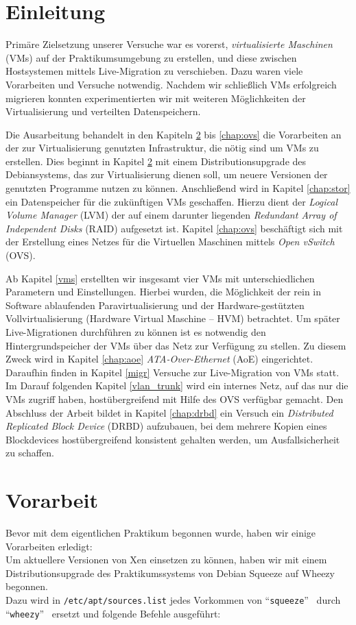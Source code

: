 \chapter{Einleitung}

Primäre Zielsetzung unserer Versuche war es vorerst, \emph{virtualisierte
Maschinen} (VMs) auf der Praktikumsumgebung zu erstellen, und diese
zwischen Hostsystemen mittels Live-Migration zu verschieben. Dazu waren viele
Vorarbeiten und Versuche notwendig. Nachdem wir schließlich VMs erfolgreich migrieren konnten experimentierten wir mit
weiteren Möglichkeiten der Virtualisierung und verteilten Datenspeichern.

Die Ausarbeitung behandelt in den Kapiteln \ref{chap:whezzy_ugprade} bis \ref{chap:ovs} die Vorarbeiten
an der zur Virtualisierung genutzten Infrastruktur, die nötig sind um VMs zu erstellen.
Dies beginnt in Kapitel \ref{chap:whezzy_ugprade} mit einem Distributionsupgrade des Debiansystems, 
das zur Virtualisierung dienen soll, um neuere Versionen der genutzten Programme nutzen zu können. Anschließend wird in Kapitel \ref{chap:stor} ein Datenspeicher für die zukünftigen VMs geschaffen. Hierzu dient der \emph{Logical Volume Manager} (LVM) der auf einem darunter liegenden \emph{Redundant Array of Independent Disks} (RAID) aufgesetzt ist. Kapitel \ref{chap:ovs} beschäftigt sich mit der Erstellung eines Netzes für die Virtuellen Maschinen mittels \emph{Open vSwitch} (OVS).

Ab Kapitel \ref{vms} erstellten wir insgesamt vier VMs mit unterschiedlichen
Parametern und Einstellungen. Hierbei wurden, die Möglichkeit der rein in Software ablaufenden Paravirtualisierung und der Hardware-gestützten Vollvirtualisierung (Hardware Virtual Maschine -- HVM) betrachtet. Um später Live-Migrationen durchführen zu können ist es notwendig den Hintergrundspeicher der VMs über das Netz zur Verfügung zu stellen. Zu diesem Zweck wird in Kapitel \ref{chap:aoe} \emph{ATA-Over-Ethernet} (AoE) eingerichtet. Daraufhin finden in Kapitel \ref{migr} Versuche zur Live-Migration von VMs statt. Im Darauf folgenden Kapitel \ref{vlan_trunk} wird ein internes Netz, auf das nur die VMs zugriff haben, hostübergreifend mit Hilfe des OVS verfügbar gemacht. Den Abschluss der Arbeit bildet in Kapitel \ref{chap:drbd} ein Versuch ein \emph{Distributed Replicated Block Device} (DRBD) aufzubauen, bei dem mehrere Kopien eines Blockdevices hostübergreifend konsistent gehalten werden, um Ausfallsicherheit zu schaffen.

\chapter{Vorarbeit}
\label{chap:whezzy_ugprade}
Bevor mit dem eigentlichen Praktikum begonnen wurde, haben wir einige Vorarbeiten erledigt: \\ 
Um aktuellere Versionen von Xen einsetzen zu können, haben wir mit einem Distributionsupgrade des Praktikumssystems von Debian Squeeze auf Wheezy begonnen. \\ 
Dazu wird in \verb#/etc/apt/sources.list# jedes Vorkommen von \textquotedblleft\verb#squeeze#\textquotedblright ~ durch \textquotedblleft\verb#wheezy#\textquotedblright ~ ersetzt und folgende Befehle ausgeführt: 

